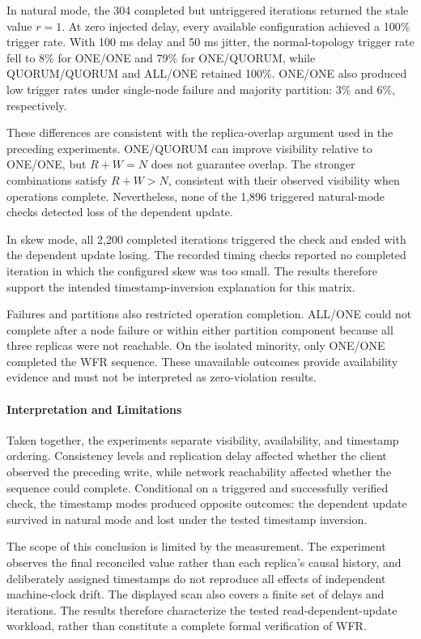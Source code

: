 In natural mode, the 304 completed but untriggered iterations returned the stale value \(r=1\). At zero injected delay, every available configuration achieved a 100\% trigger rate. With 100 ms delay and 50 ms jitter, the normal-topology trigger rate fell to 8\% for ONE/ONE and 79\% for ONE/QUORUM, while QUORUM/QUORUM and ALL/ONE retained 100\%. ONE/ONE also produced low trigger rates under single-node failure and majority partition: 3\% and 6\%, respectively.

These differences are consistent with the replica-overlap argument used in the preceding experiments. ONE/QUORUM can improve visibility relative to ONE/ONE, but \(R+W=N\) does not guarantee overlap. The stronger combinations satisfy \(R+W>N\), consistent with their observed visibility when operations complete. Nevertheless, none of the 1,896 triggered natural-mode checks detected loss of the dependent update.

In skew mode, all 2,200 completed iterations triggered the check and ended with the dependent update losing. The recorded timing checks reported no completed iteration in which the configured skew was too small. The results therefore support the intended timestamp-inversion explanation for this matrix.

Failures and partitions also restricted operation completion. ALL/ONE could not complete after a node failure or within either partition component because all three replicas were not reachable. On the isolated minority, only ONE/ONE completed the WFR sequence. These unavailable outcomes provide availability evidence and must not be interpreted as zero-violation results.

\paragraph{Interpretation and Limitations}\label{wfr:interpretation-and-limitations}

Taken together, the experiments separate visibility, availability, and timestamp ordering. Consistency levels and replication delay affected whether the client observed the preceding write, while network reachability affected whether the sequence could complete. Conditional on a triggered and successfully verified check, the timestamp modes produced opposite outcomes: the dependent update survived in natural mode and lost under the tested timestamp inversion.

The scope of this conclusion is limited by the measurement. The experiment observes the final reconciled value rather than each replica's causal history, and deliberately assigned timestamps do not reproduce all effects of independent machine-clock drift. The displayed scan also covers a finite set of delays and iterations. The results therefore characterize the tested read-dependent-update workload, rather than constitute a complete formal verification of WFR.
